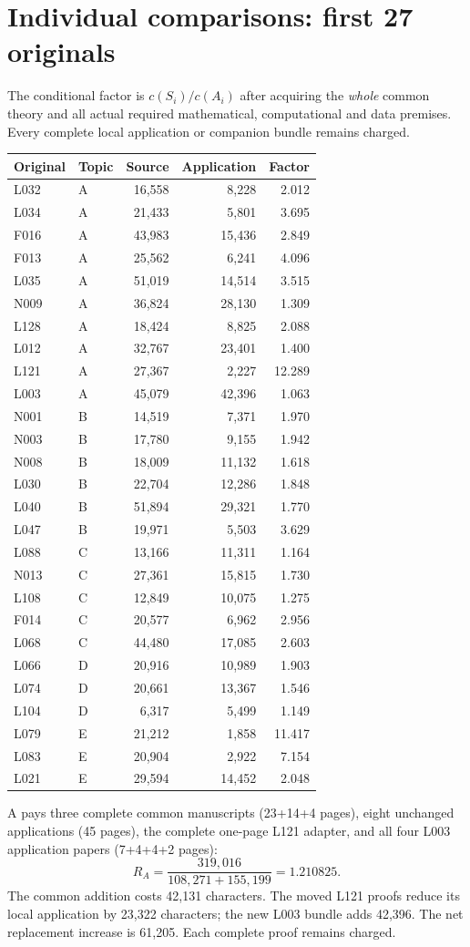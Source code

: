 \documentclass[11pt,a4paper]{article}
\begin{document}
\section*{Individual comparisons: first 27 originals}
The conditional factor is $c(S_i)/c(A_i)$ after acquiring the \emph{whole} common theory and all actual required mathematical, computational and data premises. Every complete local application or companion bundle remains charged.
\begin{center}\small\begin{tabular}{llrrr}\toprule
Original & Topic & Source & Application & Factor\\\midrule
L032 & A & 16,558 & 8,228 & 2.012 \\
L034 & A & 21,433 & 5,801 & 3.695 \\
F016 & A & 43,983 & 15,436 & 2.849 \\
F013 & A & 25,562 & 6,241 & 4.096 \\
L035 & A & 51,019 & 14,514 & 3.515 \\
N009 & A & 36,824 & 28,130 & 1.309 \\
L128 & A & 18,424 & 8,825 & 2.088 \\
L012 & A & 32,767 & 23,401 & 1.400 \\
L121 & A & 27,367 & 2,227 & 12.289 \\
L003 & A & 45,079 & 42,396 & 1.063 \\
N001 & B & 14,519 & 7,371 & 1.970 \\
N003 & B & 17,780 & 9,155 & 1.942 \\
N008 & B & 18,009 & 11,132 & 1.618 \\
L030 & B & 22,704 & 12,286 & 1.848 \\
L040 & B & 51,894 & 29,321 & 1.770 \\
L047 & B & 19,971 & 5,503 & 3.629 \\
L088 & C & 13,166 & 11,311 & 1.164 \\
N013 & C & 27,361 & 15,815 & 1.730 \\
L108 & C & 12,849 & 10,075 & 1.275 \\
F014 & C & 20,577 & 6,962 & 2.956 \\
L068 & C & 44,480 & 17,085 & 2.603 \\
L066 & D & 20,916 & 10,989 & 1.903 \\
L074 & D & 20,661 & 13,367 & 1.546 \\
L104 & D & 6,317 & 5,499 & 1.149 \\
L079 & E & 21,212 & 1,858 & 11.417 \\
L083 & E & 20,904 & 2,922 & 7.154 \\
L021 & E & 29,594 & 14,452 & 2.048 \\\bottomrule\end{tabular}\end{center}
A pays three complete common manuscripts (23+14+4 pages), eight unchanged applications (45 pages), the complete one-page L121 adapter, and all four L003 application papers (7+4+4+2 pages):
\[R_A=\frac{319,016}{108,271+155,199}=1.210825.\]
The common addition costs 42,131 characters. The moved L121 proofs reduce its local application by 23,322 characters; the new L003 bundle adds 42,396. The net replacement increase is 61,205. Each complete proof remains charged.
\newpage
\end{document}
